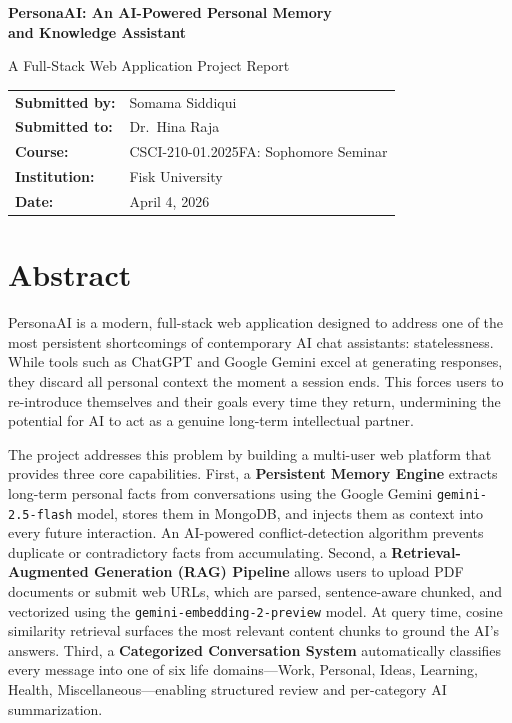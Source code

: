 \documentclass[12pt,a4paper]{report}
\begin{document}

\begin{titlepage}
\centering
\vspace*{2cm}
{\LARGE\bfseries PersonaAI: An AI-Powered Personal Memory\\ and Knowledge Assistant\par}
\vspace{1.5cm}
{\large A Full-Stack Web Application Project Report\par}
\vfill
\begin{tabular}{@{}ll}
\textbf{Submitted by:}     & Somama Siddiqui \\[4pt]
\textbf{Submitted to:}     & Dr.\ Hina Raja \\[4pt]
\textbf{Course:}           & CSCI-210-01.2025FA: Sophomore Seminar \\[4pt]
\textbf{Institution:}      & Fisk University \\[4pt]
\textbf{Date:}             & April 4, 2026 \\
\end{tabular}
\vspace{2cm}
\end{titlepage}

\cleardoublepage
{}

\chapter*{Abstract}

PersonaAI is a modern, full-stack web application designed to address one of the most persistent shortcomings of contemporary AI chat assistants: statelessness. While tools such as ChatGPT and Google Gemini excel at generating responses, they discard all personal context the moment a session ends. This forces users to re-introduce themselves and their goals every time they return, undermining the potential for AI to act as a genuine long-term intellectual partner.

The project addresses this problem by building a multi-user web platform that provides three core capabilities. First, a \textbf{Persistent Memory Engine} extracts long-term personal facts from conversations using the Google Gemini \texttt{gemini-2.5-flash} model, stores them in MongoDB, and injects them as context into every future interaction. An AI-powered conflict-detection algorithm prevents duplicate or contradictory facts from accumulating. Second, a \textbf{Retrieval-Augmented Generation (RAG) Pipeline} allows users to upload PDF documents or submit web URLs, which are parsed, sentence-aware chunked, and vectorized using the \texttt{gemini-embedding-2-preview} model. At query time, cosine similarity retrieval surfaces the most relevant content chunks to ground the AI's answers. Third, a \textbf{Categorized Conversation System} automatically classifies every message into one of six life domains—Work, Personal, Ideas, Learning, Health, Miscellaneous—enabling structured review and per-category AI summarization.
\end{document}
